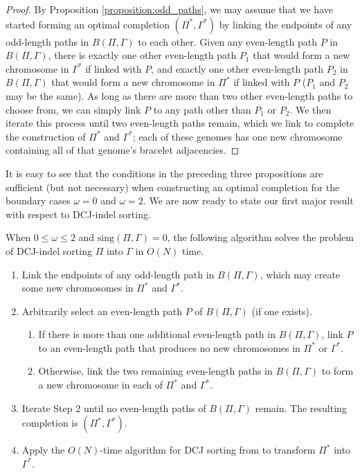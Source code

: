 \begin{proof}
By Proposition \ref{proposition:odd_paths}, we may assume that we have started forming an optimal completion $(\Pi^{*}, \Gamma^{*})$ by linking the endpoints of any odd-length paths in $B(\Pi, \Gamma)$ to each other.  Given any even-length path $P$ in $B(\Pi, \Gamma)$, there is exactly one other even-length path $P_1$ that would form a new chromosome in $\Gamma^{*}$ if linked with $P$, and exactly one other even-length path $P_2$ in $B(\Pi, \Gamma)$ that would form a new chromosome in $\Pi^{*}$ if linked with $P$ ($P_1$ and $P_2$ may be the same).  As long as there are more than two other even-length paths to choose from, we can simply link $P$ to any path other than $P_1$ or $P_2$. We then iterate this process until two even-length paths remain, which we link to complete the construction of $\Pi^{*}$ and $\Gamma^{*}$; each of these genomes has  one new chromosome containing all of that genome's bracelet adjacencies.
\end{proof}

\noindent It is easy to see that the conditions in the preceding three propositions are sufficient (but not necessary) when constructing an optimal completion for the boundary cases $\omega = 0$ and $\omega = 2$.  We are now ready to state our first major result with respect to DCJ-indel sorting.

\begin{algorithm}
When $0 \leq \omega \leq 2$ and $\mathrm{sing}(\Pi, \Gamma) = 0$, the following algorithm solves the problem of DCJ-indel sorting $\Pi$ into $\Gamma$ in $O(N)$ time.
\begin{enumerate}
\item Link the endpoints of any odd-length path in $B(\Pi, \Gamma)$, which may create some new chromosomes in $\Pi^{*}$ and $\Gamma^{*}$.
\item Arbitrarily select an even-length path $P$ of $B(\Pi, \Gamma)$ (if one exists).
\begin{enumerate}
\item If there is more than one additional even-length path in $B(\Pi, \Gamma)$, link $P$ to an even-length path that produces no new chromosomes in $\Pi^{*}$ or $\Gamma^{*}$.
\item Otherwise, link the two remaining even-length paths in $B(\Pi, \Gamma)$ to form a new chromosome in each of $\Pi^{*}$ and $\Gamma^{*}$.
\end{enumerate}
\item Iterate Step 2 until no even-length paths of $B(\Pi, \Gamma)$ remain. The resulting completion is $(\Pi^{*}, \Gamma^{*})$.
\item Apply the $O(N)$-time algorithm for DCJ sorting from \cite{yancopoulos} to transform $\Pi^{*}$ into $\Gamma^{*}$.
\end{enumerate}
\label{algorithm:small_omega}
\end{algorithm}

